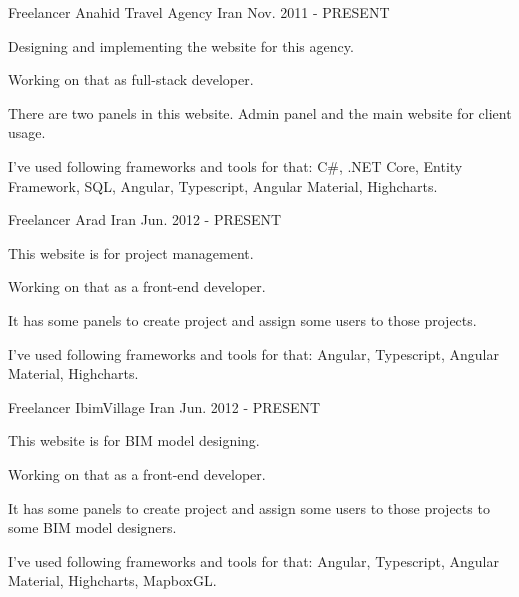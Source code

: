 

\begin{cventries}

  \cventry
    {Freelancer} %
    {Anahid Travel Agency} %
    {Iran} %
    {Nov. 2011 - PRESENT} %
    {
      \begin{cvitems} %
        \item {Designing and implementing the website for this agency.}
        \item {Working on that as full-stack developer.}
        \item {There are two panels in this website. Admin panel and the main website for client usage.}
        \item {I've used following frameworks and tools for that: C\#, .NET Core, Entity Framework, SQL, Angular, Typescript, Angular Material, Highcharts.}
      \end{cvitems}
    }

  \cventry
    {Freelancer} %
    {Arad} %
    {Iran} %
    {Jun. 2012 - PRESENT} %
    {
      \begin{cvitems} %
        \item {This website is for project management.}
        \item {Working on that as a front-end developer.}
        \item {It has some panels to create project and assign some users to those projects.}
        \item {I've used following frameworks and tools for that: Angular, Typescript, Angular Material, Highcharts.}
      \end{cvitems}
    }

\cventry
{Freelancer} %
{IbimVillage} %
{Iran} %
{Jun. 2012 - PRESENT} %
{
	\begin{cvitems} %
		\item {This website is for BIM model designing.}
		\item {Working on that as a front-end developer.}
		\item {It has some panels to create project and assign some users to those projects to some BIM model designers.}
		\item {I've used following frameworks and tools for that: Angular, Typescript, Angular Material, Highcharts, MapboxGL.}
	\end{cvitems}
}

\end{cventries}
